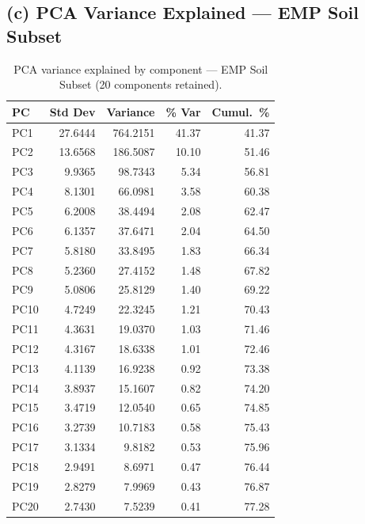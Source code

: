 \documentclass[12pt, oneside]{report}
\begin{document}
\subsection*{(c) PCA Variance Explained --- EMP Soil Subset}

\begin{table}[H]
\centering
\caption[PCA variance --- EMP Soil]{PCA variance explained by component --- EMP Soil Subset (20 components retained).}
\label{tab:supp4b}
\small
\begin{tabular}{lrrrr}
\toprule
\textbf{PC} & \textbf{Std Dev} & \textbf{Variance} & \textbf{\% Var} & \textbf{Cumul.\ \%} \\
\midrule
PC1  & 27.6444 & 764.2151 & 41.37 & 41.37 \\
PC2  & 13.6568 & 186.5087 & 10.10 & 51.46 \\
PC3  &  9.9365 &  98.7343 &  5.34 & 56.81 \\
PC4  &  8.1301 &  66.0981 &  3.58 & 60.38 \\
PC5  &  6.2008 &  38.4494 &  2.08 & 62.47 \\
PC6  &  6.1357 &  37.6471 &  2.04 & 64.50 \\
PC7  &  5.8180 &  33.8495 &  1.83 & 66.34 \\
PC8  &  5.2360 &  27.4152 &  1.48 & 67.82 \\
PC9  &  5.0806 &  25.8129 &  1.40 & 69.22 \\
PC10 &  4.7249 &  22.3245 &  1.21 & 70.43 \\
PC11 &  4.3631 &  19.0370 &  1.03 & 71.46 \\
PC12 &  4.3167 &  18.6338 &  1.01 & 72.46 \\
PC13 &  4.1139 &  16.9238 &  0.92 & 73.38 \\
PC14 &  3.8937 &  15.1607 &  0.82 & 74.20 \\
PC15 &  3.4719 &  12.0540 &  0.65 & 74.85 \\
PC16 &  3.2739 &  10.7183 &  0.58 & 75.43 \\
PC17 &  3.1334 &   9.8182 &  0.53 & 75.96 \\
PC18 &  2.9491 &   8.6971 &  0.47 & 76.44 \\
PC19 &  2.8279 &   7.9969 &  0.43 & 76.87 \\
PC20 &  2.7430 &   7.5239 &  0.41 & 77.28 \\
\bottomrule
\end{tabular}
\end{table}

\newpage

\end{document}
